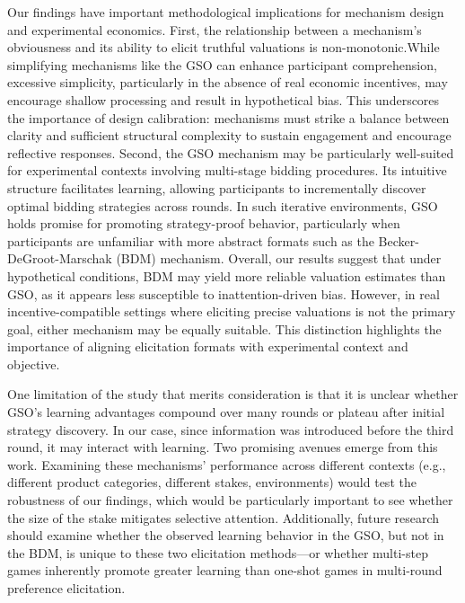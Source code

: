 \documentclass[12pt]{article}
\begin{document}
Our findings have important methodological implications for mechanism design and experimental economics. First, the relationship between a mechanism’s obviousness and its ability to elicit truthful valuations is non-monotonic.While simplifying mechanisms like the GSO can enhance participant comprehension, excessive simplicity, particularly in the absence of real economic incentives, may encourage shallow processing and result in hypothetical bias. This underscores the importance of design calibration: mechanisms must strike a balance between clarity and sufficient structural complexity to sustain engagement and encourage reflective responses. Second, the GSO mechanism may be particularly well-suited for experimental contexts involving multi-stage bidding procedures. Its intuitive structure facilitates learning, allowing participants to incrementally discover optimal bidding strategies across rounds. In such iterative environments, GSO holds promise for promoting strategy-proof behavior, particularly when participants are unfamiliar with more abstract formats such as the Becker-DeGroot-Marschak (BDM) mechanism.
Overall, our results suggest that under hypothetical conditions, BDM may yield more reliable valuation estimates than GSO, as it appears less susceptible to inattention-driven bias. However, in real incentive-compatible settings where eliciting precise valuations is not the primary goal, either mechanism may be equally suitable. This distinction highlights the importance of aligning elicitation formats with experimental context and objective.

One limitation of the study that merits consideration is that it is unclear whether GSO's learning advantages compound over many rounds or plateau after initial strategy discovery. In our case, since information was introduced before the third round, it may interact with learning.
Two promising avenues emerge from this work. Examining these mechanisms' performance across different contexts (e.g., different product categories, different stakes, environments) would test the robustness of our findings, which would be particularly important to see whether the size of the stake mitigates selective attention. Additionally, future research should examine whether the observed learning behavior in the GSO, but not in the BDM, is unique to these two elicitation methods—or whether multi-step games inherently promote greater learning than one-shot games in multi-round preference elicitation. 



\end{document}
